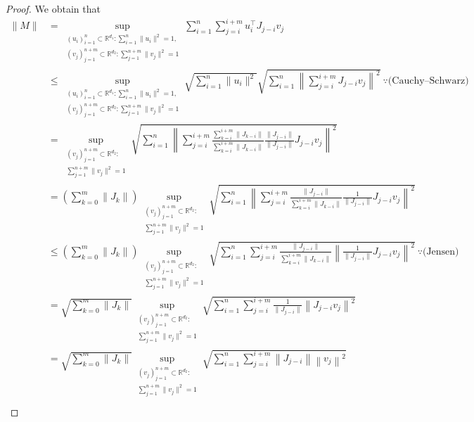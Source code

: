 \documentclass[11pt,a4paper]{article}
\theoremstyle{remark}
\theoremstyle{definition}
\newcommand{\bu}{u}
\newcommand{\bv}{v}
\newcommand{\bfJ}{J}
\newcommand{\bfM}{M}
\newcommand{\R}{\mathbb{R}}
\theoremstyle{definition}
\begin{document}
\begin{bibunit}[apalike]
\begin{proof}
    We obtain that
    \begin{align*}
        \|\bfM\|
        &=\sup_{\substack{(\bu_{i})_{i=1}^{n}\subset\R^{d_{1}}:\sum_{i=1}^{n}\|\bu_{i}\|^{2}=1,\\(\bv_{j})_{j=1}^{n+m}\subset\R^{d_{2}}:\sum_{j=1}^{n+m}\|\bv_{j}\|^{2}=1}}
        \sum_{i=1}^{n}\sum_{j=i}^{i+m}\bu_{i}^{\top}\bfJ_{j-i}\bv_{j}\\
        &\le \sup_{\substack{(\bu_{i})_{i=1}^{n}\subset\R^{d_{1}}:\sum_{i=1}^{n}\|\bu_{i}\|^{2}=1,\\(\bv_{j})_{j=1}^{n+m}\subset\R^{d_{2}}:\sum_{j=1}^{n+m}\|\bv_{j}\|^{2}=1}}
        \sqrt{\sum_{i=1}^{n}\|\bu_{i}\|^{2}}\sqrt{\sum_{i=1}^{n}\left\|\sum_{j=i}^{i+m}\bfJ_{j-i}\bv_{j}\right\|^{2}}\ \because\text{(Cauchy--Schwarz)}\\
        &= \sup_{\substack{(\bv_{j})_{j=1}^{n+m}\subset\R^{d_{2}}:\\
        \sum_{j=1}^{n+m}\|\bv_{j}\|^{2}=1}}
        \sqrt{\sum_{i=1}^{n}\left\|\sum_{j=i}^{i+m}\frac{\sum_{k=i}^{i+m}\|\bfJ_{k-i}\|}{\sum_{k=i}^{i+m}\|\bfJ_{k-i}\|}\frac{\|\bfJ_{j-i}\|}{\|\bfJ_{j-i}\|}\bfJ_{j-i}\bv_{j}\right\|^{2}}\\
        &= \left(\sum_{k=0}^{m}\|\bfJ_{k}\|\right)\sup_{\substack{(\bv_{j})_{j=1}^{n+m}\subset\R^{d_{2}}:\\
        \sum_{j=1}^{n+m}\|\bv_{j}\|^{2}=1}}
        \sqrt{\sum_{i=1}^{n}\left\|\sum_{j=i}^{i+m}\frac{\|\bfJ_{j-i}\|}{\sum_{k=i}^{i+m}\|\bfJ_{k-i}\|}\frac{1}{\|\bfJ_{j-i}\|}\bfJ_{j-i}\bv_{j}\right\|^{2}}\\
        &\le \left(\sum_{k=0}^{m}\|\bfJ_{k}\|\right)\sup_{\substack{(\bv_{j})_{j=1}^{n+m}\subset\R^{d_{2}}:\\
        \sum_{j=1}^{n+m}\|\bv_{j}\|^{2}=1}}
        \sqrt{\sum_{i=1}^{n}\sum_{j=i}^{i+m}\frac{\|\bfJ_{j-i}\|}{\sum_{k=i}^{i+m}\|\bfJ_{k-i}\|}\left\|\frac{1}{\|\bfJ_{j-i}\|}\bfJ_{j-i}\bv_{j}\right\|^{2}}\ \because\text{(Jensen)}\\
        &=\sqrt{\sum_{k=0}^{m}\|\bfJ_{k}\|}\sup_{\substack{(\bv_{j})_{j=1}^{n+m}\subset\R^{d_{2}}:\\
        \sum_{j=1}^{n+m}\|\bv_{j}\|^{2}=1}}
        \sqrt{\sum_{i=1}^{n}\sum_{j=i}^{i+m}\frac{1}{\|\bfJ_{j-i}\|}\left\|\bfJ_{j-i}\bv_{j}\right\|^{2}}\\
        &=\sqrt{\sum_{k=0}^{m}\|\bfJ_{k}\|}\sup_{\substack{(\bv_{j})_{j=1}^{n+m}\subset\R^{d_{2}}:\\
        \sum_{j=1}^{n+m}\|\bv_{j}\|^{2}=1}}
        \sqrt{\sum_{i=1}^{n}\sum_{j=i}^{i+m}\left\|\bfJ_{j-i}\right\|\left\|\bv_{j}\right\|^{2}}\\

\end{align*}
\end{proof}
\end{bibunit}
\end{document}
